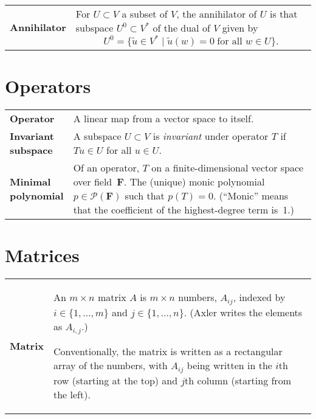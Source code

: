\documentclass[10pt, a4paper, landscape]{article}
\newcommand{\defn}[1]{\textbf{#1}}
\newlength{\termheaderwd}
\begin{document}
\begin{multicols*}{3}
\begin{tabularx}{\columnwidth}{@{}l>{\raggedright\arraybackslash}X@{}}
  \defn{Annihilator} & For $U\subset V$ a subset of $V$, the annihilator of $U$ is that subspace $U^0\subset V^*$ of the dual of $V$ given by
                       \[
                       U^0 = \{ \tilde{u}\in V^* \mid \tilde{u}(w)=0 \;\text{for all $w\in U$} \}.
                       \]
\end{tabularx}

  
\section*{Operators}
\begin{tabularx}{\columnwidth}{@{}l>{\raggedright\arraybackslash}X@{}}
  \toprule
  \settowidth{\termheaderwd}{polynomial}
  \defn{Operator} & A linear map from a vector space to itself. \\

  \parbox[t]{\termheaderwd}{\defn{Invariant\\ subspace}} & A subspace $U \subset V$ is \emph{invariant} under operator $T$ if $T u\in U$ for all $u\in U$. \\

  \parbox[t]{\termheaderwd}{\defn{Minimal\\ polynomial}} & Of an operator, $T$ on a finite-dimensional vector space over field~$\mathbold{F}$. The (unique) monic polynomial $p\in\mathcal{P}(\mathbold{F})$ such that $p(T)=0$. (``Monic'' means that the coefficient of the highest-degree term is~1.)  \\
  

\end{tabularx}


\section*{Matrices}
\begin{tabularx}{\columnwidth}{@{}l>{\raggedright\arraybackslash}X@{}}
  \toprule
  \defn{Matrix} & An $m\times n$ matrix $A$ is $m\times n$ numbers, $A_{ij}$, indexed by $i\in\{1,\dotsc, m\}$ and $j\in\{1,\dotsc, n\}$. (Axler writes the elements as $A_{i,j}$.)

  Conventionally, the matrix is written as a rectangular array of the
  numbers, with $A_{ij}$ being written in the $i$th row (starting at the
  top) and $j$th column (starting from the left).
  

\end{tabularx}
\end{multicols*}
\end{document}
